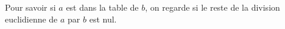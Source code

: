 Pour savoir si $a$ est dans la table de $b$, on regarde si le reste de la
division euclidienne de $a$ par $b$ est nul.